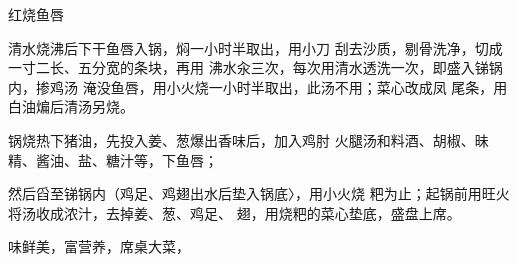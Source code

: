 \begin{recipe}{红烧鱼唇}

\ingredients


\cooking

\step 清水烧沸后下干鱼唇入锅，焖一小时半取出，用小刀 刮去沙质，剔骨洗净，切成一寸二长、五分宽的条块，再用 沸水汆三次，每次用清水透洗一次，即盛入锑锅内，掺鸡汤 淹没鱼唇，用小火烧一小时半取出，此汤不用；菜心改成凤 尾条，用白油煸后清汤另烧。

锅烧热下猪油，先投入姜、葱爆出香味后，加入鸡肘 火腿汤和料酒、胡椒、昧精、酱油、盐、糖汁等，下鱼唇；

然后舀至锑锅内（鸡足、鸡翅出水后垫入锅底〉，用小火烧 粑为止；起锅前用旺火将汤收成浓汁，去掉姜、葱、鸡足、 翅，用烧粑的菜心垫底，盛盘上席。

\notes

味鲜美，富营养，席桌大菜，

\end{recipe}

